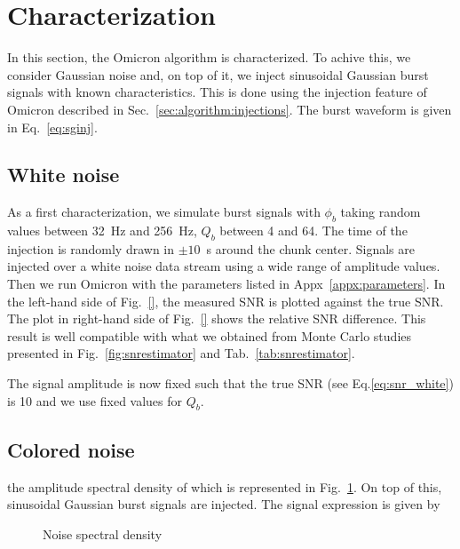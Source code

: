 \section{Characterization} \label{sec:characterization}

In this section, the Omicron algorithm is characterized. To achive this, we consider Gaussian noise and, on top of it, we inject sinusoidal Gaussian burst signals with known characteristics. This is done using the injection feature of Omicron described in Sec.~\ref{sec:algorithm:injections}. The burst waveform is given in Eq.~\ref{eq:sginj}.

\subsection{White noise} \label{sec:characterization:white}

As a first characterization, we simulate burst signals with $\phi_b$ taking random values between 32~Hz and 256~Hz, $Q_b$ between 4 and 64. The time of the injection is randomly drawn in $\pm10$~s around the chunk center. Signals are injected over a white noise data stream using a wide range of amplitude values. Then we run Omicron with the parameters listed in Appx~\ref{appx:parameters}. In the left-hand side of Fig.~\ref{}, the measured SNR is plotted against the true SNR. The plot in right-hand side of Fig.~\ref{} shows the relative SNR difference. This result is well compatible with what we obtained from Monte Carlo studies presented in Fig.~\ref{fig:snrestimator} and Tab.~\ref{tab:snrestimator}.

The signal amplitude is now fixed such that the true SNR (see Eq.\ref{eq:snr_white}) is 10 and we use fixed values for $Q_b$. 

\subsection{Colored noise} \label{sec:characterization:colored}

the amplitude spectral density of which is represented in Fig.~\ref{fig:noise_asd}. On top of this, sinusoidal Gaussian burst signals are injected. The signal expression is given by 
\begin{figure}
  \center
  \caption{Noise spectral density}
  \label{fig:noise_asd}
\end{figure}
